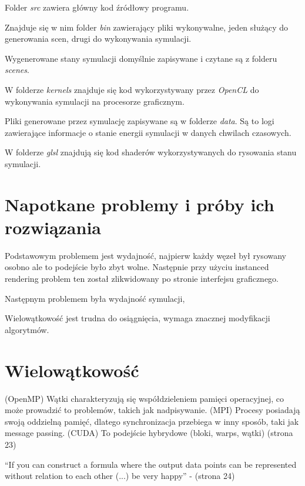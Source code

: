 \documentclass[12pt, letterpaper]{report}
\begin{document}
    Folder \emph{src} zawiera główny kod źródłowy programu. 
    
    Znajduje się w nim folder \emph{bin} zawierający pliki wykonywalne, jeden służący do generowania scen, drugi do wykonywania symulacji. 
    
    Wygenerowane stany symulacji domyślnie zapisywane i czytane są z folderu \emph{scenes}. 
    
    W folderze \emph{kernels} znajduje się kod wykorzystywany przez \emph{OpenCL} do wykonywania symulacji na procesorze graficznym. 
    
    Pliki generowane przez symulację zapisywane są w folderze \emph{data}. Są to logi zawierające informacje o stanie energii
    symulacji w danych chwilach czasowych.
    
    W folderze \emph{glsl} znajdują się kod shaderów wykorzystywanych do rysowania stanu symulacji.

    
    \section{Napotkane problemy i próby ich rozwiązania}
    Podstawowym problemem jest wydajność, najpierw każdy węzeł był rysowany osobno ale to podejście 
    było zbyt wolne. Następnie przy użyciu instanced rendering problem ten został zlikwidowany po 
    stronie interfejsu graficznego.
    
    Następnym problemem była wydajność symulacji,
    
    Wielowątkowość jest trudna do osiągnięcia, wymaga znacznej modyfikacji algorytmów.
    
    \section{Wielowątkowość}
    (OpenMP) Wątki charakteryzują się współdzieleniem pamięci operacyjnej, co może prowadzić to problemów, takich jak nadpisywanie.
    (MPI) Procesy posiadają swoją oddzielną pamięć, dlatego synchronizacja przebiega w inny sposób, taki jak message passing.
    (CUDA) To podejście hybrydowe (bloki, warps, wątki)  \cite{cuda} (strona 23)

    ``If you can construct a formula where the output data points can be represented without 
    relation to each other (...) be very happy'' - \cite{cuda} (strona 24)
    
\end{document}
